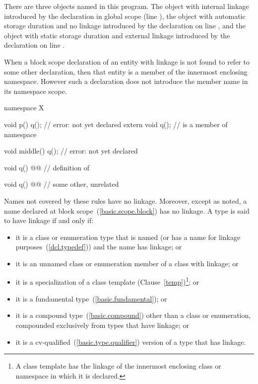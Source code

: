 There are three objects named  in this program. The object with
internal linkage introduced by the declaration in global scope (line
 ), the object with automatic storage duration and no linkage
introduced by the declaration on line , and the object with
static storage duration and external linkage introduced by the
declaration on line . \exitexample

\pnum
When a block scope declaration of an entity with linkage is not found to
refer to some other declaration, then that entity is a member of the
innermost enclosing namespace. However such a declaration does not
introduce the member name in its namespace scope. \enterexample

\begin{codeblock}
namespace X {
  void p() {
    q();                        // error:  not yet declared
    extern void q();            //  is a member of namespace 
  }

  void middle() {
    q();                        // error:  not yet declared
  }

  void q() @@       // definition of         
}

void q() @@         // some other, unrelated 
\end{codeblock}
\exitexample 

\pnum
{}%
Names not covered by these rules have no linkage. Moreover, except as
noted, a name declared at block scope~(\ref{basic.scope.block}) has no
linkage. A type is said to have linkage if and only if:

\begin{itemize}
\item it is a class or enumeration type that is named (or has a name for
linkage purposes~(\ref{dcl.typedef})) and the name has linkage; or

\item it is an unnamed class or enumeration member of a class with linkage; or

\item it is a specialization of a class template (Clause~\ref{temp})\footnote{A class
template has the linkage of the innermost enclosing class or namespace in which
it is declared.};
or

\item it is a fundamental type~(\ref{basic.fundamental}); or

\item it is a compound type~(\ref{basic.compound}) other than a class or
enumeration, compounded exclusively from types that have linkage; or

\item it is a cv-qualified~(\ref{basic.type.qualifier}) version of a
type that has linkage.
\end{itemize}

